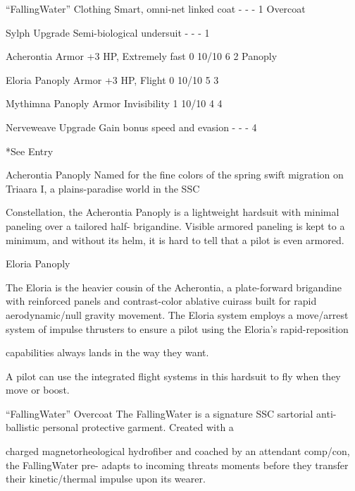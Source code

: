   “FallingWater”          Clothing      Smart, omni-net linked coat              -            -            -       1 
 Overcoat 

 Sylph                    Upgrade       Semi-biological undersuit                -            -            -       1 

 Acherontia              Armor          +3 HP, Extremely fast                    0            10/10        6      2 
 Panoply 

 Eloria Panoply          Armor          +3 HP, Flight                            0            10/10        5      3 

 Mythimna Panoply        Armor          Invisibility                             1            10/10        4      4 

 Nerveweave               Upgrade       Gain bonus speed and evasion             -            -            -      4 

*See Entry
 

Acherontia Panoply  
Named for the fine colors of the spring swift migration on Triaara I, a plains-paradise world in the SSC  

Constellation, the Acherontia Panoply is a lightweight hardsuit with minimal paneling over a tailored half- 
brigandine. Visible armored paneling is kept to a minimum, and without its helm, it is hard to tell that a pilot  
is even armored.   

Eloria Panoply  

The Eloria is the heavier cousin of the Acherontia, a plate-forward brigandine with reinforced panels and  
contrast-color ablative cuirass built for rapid aerodynamic/null gravity movement. The Eloria system  
employs a move/arrest system of impulse thrusters to ensure a pilot using the Eloria’s rapid-reposition  

capabilities always lands in the way they want. 
 

A pilot can use the integrated flight systems in this hardsuit to fly when they move or boost.
 

“FallingWater” Overcoat  
The FallingWater is a signature SSC sartorial anti-ballistic personal protective garment. Created with a  

                                                                                                                        


charged magnetorheological hydrofiber and coached by an attendant comp/con, the FallingWater pre- 
adapts to incoming threats moments before they transfer their kinetic/thermal impulse upon its wearer.   

